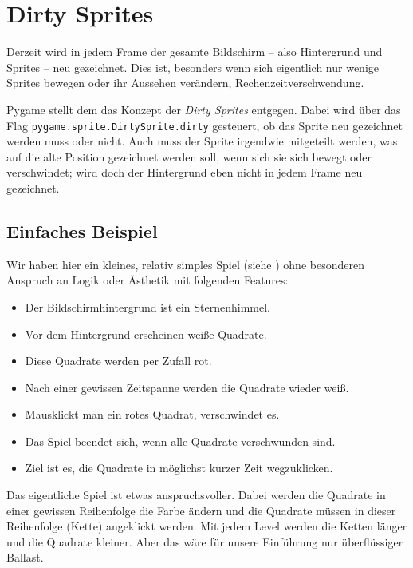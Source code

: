 \newpage
\section{Dirty Sprites}\label{secDirtySprites}
Derzeit wird in jedem Frame der gesamte Bildschirm -- also Hintergrund und Sprites -- neu gezeichnet. Dies ist, besonders wenn sich eigentlich nur wenige Sprites bewegen oder ihr Aussehen verändern, Rechenzeitverschwendung. 

Pygame stellt dem das Konzept der \emph{Dirty Sprites} entgegen. Dabei wird über das Flag \texttt{pygame.sprite.DirtySprite.dirty} gesteuert, ob das Sprite neu gezeichnet werden muss oder nicht. Auch muss der Sprite irgendwie mitgeteilt werden, was auf die alte Position gezeichnet werden soll, wenn sich sie sich bewegt oder verschwindet; wird doch der Hintergrund eben nicht in jedem Frame neu gezeichnet.



\subsection{Einfaches Beispiel}
Wir haben hier ein kleines, relativ simples Spiel (siehe ) ohne besonderen Anspruch an Logik oder Ästhetik mit folgenden Features:
\begin{itemize}
	\item Der Bildschirmhintergrund ist ein Sternenhimmel.
	\item Vor dem Hintergrund erscheinen weiße Quadrate. 
	\item Diese Quadrate werden per Zufall rot.
	\item Nach einer gewissen Zeitspanne werden die Quadrate wieder weiß.
	\item Mausklickt man ein rotes Quadrat, verschwindet es.
	\item Das Spiel beendet sich, wenn alle Quadrate verschwunden sind.
	\item Ziel ist es, die Quadrate in möglichst kurzer Zeit wegzuklicken.
\end{itemize}

Das eigentliche Spiel ist etwas anspruchsvoller. Dabei werden die Quadrate in einer gewissen Reihenfolge die Farbe ändern und die Quadrate müssen in dieser Reihenfolge (Kette) angeklickt werden. Mit jedem Level werden die Ketten länger und die Quadrate kleiner. Aber das wäre für unsere Einführung  nur überflüssiger Ballast.

